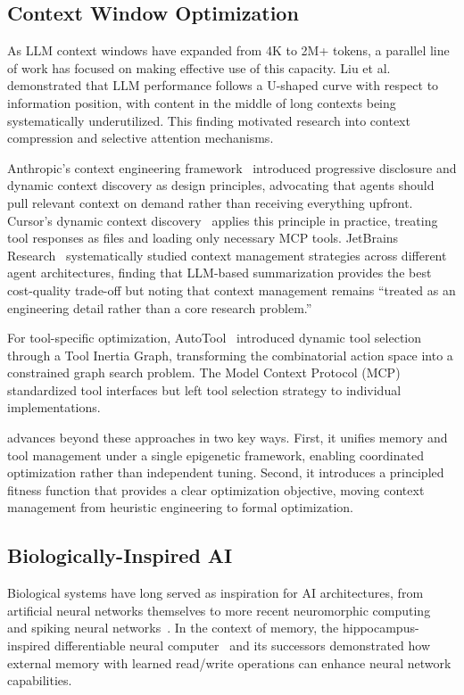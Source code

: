 \subsection{Context Window Optimization}

As LLM context windows have expanded from 4K to 2M+ tokens, a parallel line of work has focused on making effective use of this capacity. Liu et al.~\citep{liu2024lost} demonstrated that LLM performance follows a U-shaped curve with respect to information position, with content in the middle of long contexts being systematically underutilized. This finding motivated research into context compression and selective attention mechanisms.

Anthropic's context engineering framework~\citep{anthropic2025context} introduced progressive disclosure and dynamic context discovery as design principles, advocating that agents should pull relevant context on demand rather than receiving everything upfront. Cursor's dynamic context discovery~\citep{cursor2025dynamic} applies this principle in practice, treating tool responses as files and loading only necessary MCP tools. JetBrains Research~\citep{jetbrains2025context} systematically studied context management strategies across different agent architectures, finding that LLM-based summarization provides the best cost-quality trade-off but noting that context management remains ``treated as an engineering detail rather than a core research problem.''

For tool-specific optimization, AutoTool~\citep{zhang2025autotool} introduced dynamic tool selection through a Tool Inertia Graph, transforming the combinatorial action space into a constrained graph search problem. The Model Context Protocol (MCP)~\citep{mcp2025} standardized tool interfaces but left tool selection strategy to individual implementations.

\EpiContext{} advances beyond these approaches in two key ways. First, it unifies memory and tool management under a single epigenetic framework, enabling coordinated optimization rather than independent tuning. Second, it introduces a principled fitness function that provides a clear optimization objective, moving context management from heuristic engineering to formal optimization.

\subsection{Biologically-Inspired AI}

Biological systems have long served as inspiration for AI architectures, from artificial neural networks themselves to more recent neuromorphic computing~\citep{schuman2017survey} and spiking neural networks~\citep{tavanaei2019deep}. In the context of memory, the hippocampus-inspired differentiable neural computer~\citep{graves2016hybrid} and its successors demonstrated how external memory with learned read/write operations can enhance neural network capabilities.

